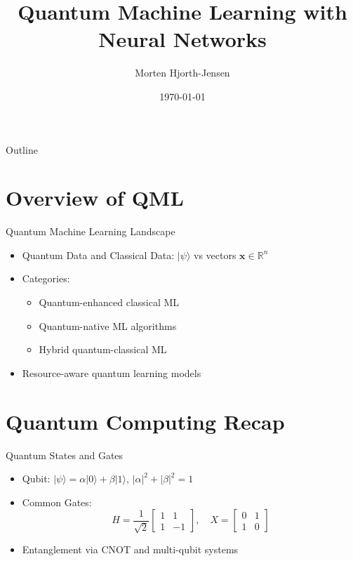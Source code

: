 \documentclass{beamer}
\title[QML with NN]{Quantum Machine Learning with Neural Networks}
\author{Morten Hjorth-Jensen}
\institute{University of Oslo}
\date{\today}
\begin{document}
\begin{frame}
  \titlepage
\end{frame}

\begin{frame}{Outline}
  \tableofcontents
\end{frame}

\section{Overview of QML}
\begin{frame}{Quantum Machine Learning Landscape}
  \begin{itemize}
    \item Quantum Data and Classical Data: \( |\psi\rangle \) vs vectors \( \mathbf{x} \in \mathbb{R}^n \)
    \item Categories:
    \begin{itemize}
        \item Quantum-enhanced classical ML
        \item Quantum-native ML algorithms
        \item Hybrid quantum-classical ML
    \end{itemize}
    \item Resource-aware quantum learning models
  \end{itemize}
\end{frame}

\section{Quantum Computing Recap}
\begin{frame}{Quantum States and Gates}
  \begin{itemize}
    \item Qubit: \( |\psi\rangle = \alpha|0\rangle + \beta|1\rangle \), \( |\alpha|^2 + |\beta|^2 = 1 \)
    \item Common Gates:
    \[
        H = \frac{1}{\sqrt{2}}\begin{bmatrix}1 & 1\\ 1 & -1\end{bmatrix}, \quad
        X = \begin{bmatrix}0 & 1\\ 1 & 0\end{bmatrix}
    \]
    \item Entanglement via CNOT and multi-qubit systems
  \end{itemize}
\end{frame}
\end{document}
